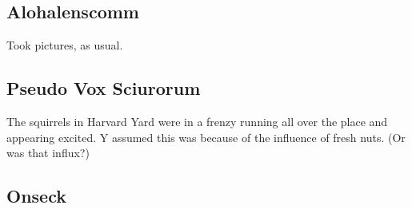 \documentclass[10pt]{article}
\begin{document}







\subsection*{Alohalenscomm}
Took pictures, as usual.

\subsection*{Pseudo Vox Sciurorum}
The squirrels in Harvard Yard were in a frenzy running all over the
place and appearing excited.  Y assumed this was because of the
influence of fresh nuts.  (Or was that influx?)

\subsection*{Onseck}
\end{document}
